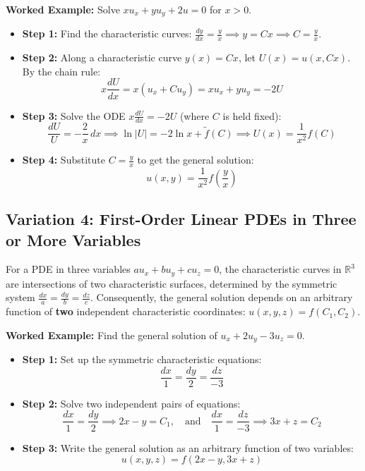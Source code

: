 \documentclass[11pt]{article}
\begin{document}
\noindent\textbf{Worked Example:} Solve $xu_x + yu_y + 2u = 0$ for $x > 0$.
\begin{itemize}
    \item \textbf{Step 1:} Find the characteristic curves: $\frac{dy}{dx} = \frac{y}{x} \implies y = Cx \implies C = \frac{y}{x}$.
    \item \textbf{Step 2:} Along a characteristic curve $y(x) = Cx$, let $U(x) = u(x, Cx)$. By the chain rule:
    \[
    x\frac{dU}{dx} = x(u_x + Cu_y) = xu_x + yu_y = -2U
    \]
    \item \textbf{Step 3:} Solve the ODE $x\frac{dU}{dx} = -2U$ (where $C$ is held fixed):
    \[
    \frac{dU}{U} = -\frac{2}{x}\,dx \implies \ln|U| = -2\ln x + \tilde{f}(C) \implies U(x) = \frac{1}{x^2}f(C)
    \]
    \item \textbf{Step 4:} Substitute $C = \frac{y}{x}$ to get the general solution:
    \[
    u(x, y) = \frac{1}{x^2}f\left(\frac{y}{x}\right)
    \]
\end{itemize}

\subsection{Variation 4: First-Order Linear PDEs in Three or More Variables}
For a PDE in three variables $a u_x + b u_y + c u_z = 0$, the characteristic curves in $\mathbb{R}^3$ are intersections of two characteristic surfaces, determined by the symmetric system $\frac{dx}{a} = \frac{dy}{b} = \frac{dz}{c}$. Consequently, the general solution depends on an arbitrary function of \textbf{two} independent characteristic coordinates: $u(x, y, z) = f(C_1, C_2)$.

\noindent\textbf{Worked Example:} Find the general solution of $u_x + 2u_y - 3u_z = 0$.
\begin{itemize}
    \item \textbf{Step 1:} Set up the symmetric characteristic equations:
    \[
    \frac{dx}{1} = \frac{dy}{2} = \frac{dz}{-3}
    \]
    \item \textbf{Step 2:} Solve two independent pairs of equations:
    \[
    \frac{dx}{1} = \frac{dy}{2} \implies 2x - y = C_1, \quad \text{and} \quad \frac{dx}{1} = \frac{dz}{-3} \implies 3x + z = C_2
    \]
    \item \textbf{Step 3:} Write the general solution as an arbitrary function of two variables:
    \[
    u(x, y, z) = f(2x - y, 3x + z)
    \]
\end{itemize}

\newpage
\end{document}
